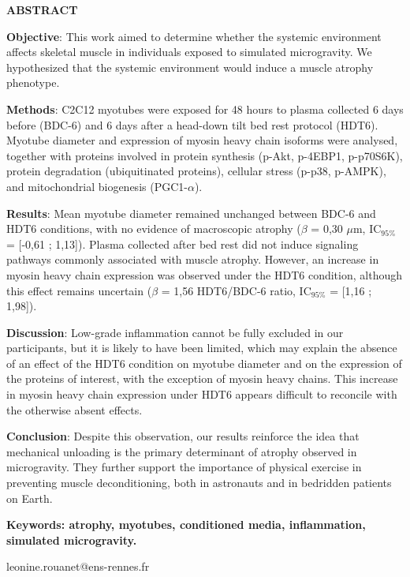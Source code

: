 \documentclass[11pt]{report}
\begin{document}
\small{{\bf{ABSTRACT}}}

 \footnotesize{{\bf{Objective}}: This work aimed to determine whether the systemic environment affects skeletal muscle in individuals exposed to simulated microgravity. We hypothesized that the systemic environment would induce a muscle atrophy phenotype. 
 
 {\bf{Methods}}: C2C12 myotubes were exposed for 48 hours to plasma collected 6 days before (BDC-6) and 6 days after a head-down tilt bed rest protocol (HDT6). Myotube diameter and expression of myosin heavy chain isoforms were analysed, together with proteins involved in protein synthesis (p-Akt, p-4EBP1, p-p70S6K), protein degradation (ubiquitinated proteins), cellular stress (p-p38, p-AMPK), and mitochondrial biogenesis (PGC1-$\alpha$).
 
 {\bf{Results}}: Mean myotube diameter remained unchanged between BDC-6 and HDT6 conditions, with no evidence of macroscopic atrophy ($\beta$ = 0,30 $\mu$m, IC$_{95\%}$ = [-0,61 ; 1,13]). Plasma collected after bed rest did not induce signaling pathways commonly associated with muscle atrophy. However, an increase in myosin heavy chain expression was observed under the HDT6 condition, although this effect remains uncertain ($\beta$ = 1,56 HDT6/BDC-6 ratio, IC$_{95\%}$ = [1,16 ; 1,98]).
 
 {\bf{Discussion}}: Low-grade inflammation cannot be fully excluded in our participants, but it is likely to have been limited, which may explain the absence of an effect of the HDT6 condition on myotube diameter and on the expression of the proteins of interest, with the exception of myosin heavy chains. This increase in myosin heavy chain expression under HDT6 appears difficult to reconcile with the otherwise absent effects.
 
 {\bf{Conclusion}}: Despite this observation, our results reinforce the idea that mechanical unloading is the primary determinant of atrophy observed in microgravity. They further support the importance of physical exercise in preventing muscle deconditioning, both in astronauts and in bedridden patients on Earth.}

\medskip
	
{\bf{Keywords: atrophy, myotubes, conditioned media, inflammation, simulated microgravity.}}

\vspace{1\baselineskip}

{leonine.rouanet@ens-rennes.fr}
\end{document}
